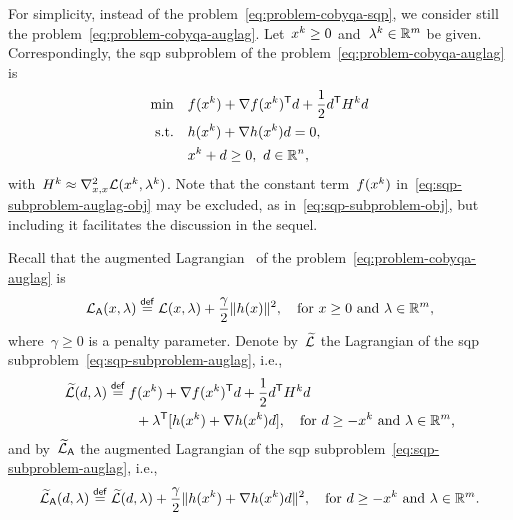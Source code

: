 For simplicity, instead of the problem~\cref{eq:problem-cobyqa-sqp}, we consider still the problem~\cref{eq:problem-cobyqa-auglag}.
Let~$\iter[k] \ge 0$ and~$\lm[k] \in \R^m$ be given.
Correspondingly, the \gls{sqp} subproblem of the problem~\cref{eq:problem-cobyqa-auglag} is
\begin{subequations}
    \label{eq:sqp-subproblem-auglag}
    \begin{align}
        \min        & \quad \obj(\iter[k]) + \nabla \obj(\iter[k])^{\T} \step + \frac{1}{2} \step^{\T} H^k \step \label{eq:sqp-subproblem-auglag-obj}\\
        \text{s.t.} & \quad h(\iter[k]) + \nabla h(\iter[k]) \step = 0,\\
                    & \quad \iter[k] + \step \ge 0, ~ \step \in \R^n,
    \end{align}
\end{subequations}
with~$H^k \approx \nabla_{x, x}^2 \lag(\iter[k], \lm[k])$.
Note that the constant term~$\obj(\iter[k])$ in~\cref{eq:sqp-subproblem-auglag-obj} may be excluded, as in~\cref{eq:sqp-subproblem-obj}, but including it facilitates the discussion in the sequel.

Recall that the augmented Lagrangian~\cite{Hestenes_1969,Powell_1969,Rockafellar_1973} of the problem~\cref{eq:problem-cobyqa-auglag} is
\begin{equation}
    \label{eq:augmented-lagrangian-inequality}
    \auglag(\iter, \lm) \eqdef \lag(\iter, \lm) + \frac{\gamma}{2} \norm{h(\iter)}^2, \quad \text{for~$\iter \ge 0$ and~$\lm \in \R^m$,}
\end{equation}
%
where~$\gamma \ge 0$ is a penalty parameter.
Denote by~$\lagalt$ the Lagrangian of the \gls{sqp} subproblem~\cref{eq:sqp-subproblem-auglag}, i.e.,
\begin{align*}
    \lagalt(\step, \lm) & \eqdef \obj(\iter[k]) + \nabla \obj(\iter[k])^{\T} \step + \frac{1}{2} \step^{\T} H^k \step\\
                        & \qquad + \lm^{\T} [h(\iter[k]) + \nabla h(\iter[k]) \step], \quad \text{for~$\step \ge -\iter[k]$ and~$\lm \in \R^m$,}
\end{align*}
and by~$\widetilde{\mathcal{L}}_{\mathsf{A}}$ the augmented Lagrangian of the \gls{sqp} subproblem~\cref{eq:sqp-subproblem-auglag}, i.e.,
\begin{equation*}
    \auglagalt(\step, \lm) \eqdef \lagalt(\step, \lm) + \frac{\gamma}{2} \norm{h(\iter[k]) + \nabla h(\iter[k]) \step}^2, \quad \text{for~$\step \ge -\iter[k]$ and~$\lm \in \R^m$.}
\end{equation*}

